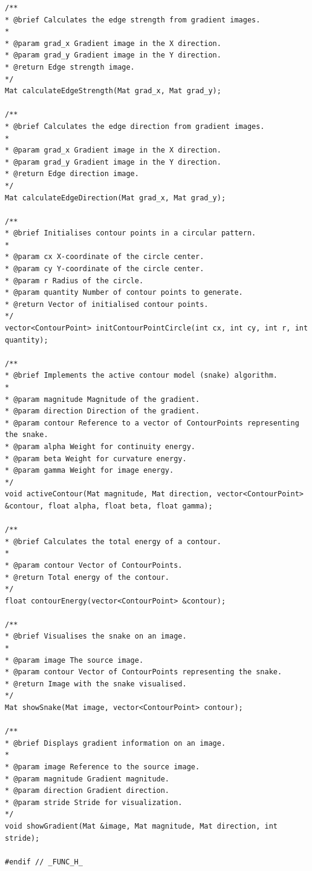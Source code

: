 \documentclass[12pt,a4paper]{report}
\begin{document}
\begin{lstlisting}
/**
* @brief Calculates the edge strength from gradient images.
*
* @param grad_x Gradient image in the X direction.
* @param grad_y Gradient image in the Y direction.
* @return Edge strength image.
*/
Mat calculateEdgeStrength(Mat grad_x, Mat grad_y);

/**
* @brief Calculates the edge direction from gradient images.
*
* @param grad_x Gradient image in the X direction.
* @param grad_y Gradient image in the Y direction.
* @return Edge direction image.
*/
Mat calculateEdgeDirection(Mat grad_x, Mat grad_y);

/**
* @brief Initialises contour points in a circular pattern.
*
* @param cx X-coordinate of the circle center.
* @param cy Y-coordinate of the circle center.
* @param r Radius of the circle.
* @param quantity Number of contour points to generate.
* @return Vector of initialised contour points.
*/
vector<ContourPoint> initContourPointCircle(int cx, int cy, int r, int quantity);

/**
* @brief Implements the active contour model (snake) algorithm.
*
* @param magnitude Magnitude of the gradient.
* @param direction Direction of the gradient.
* @param contour Reference to a vector of ContourPoints representing the snake.
* @param alpha Weight for continuity energy.
* @param beta Weight for curvature energy.
* @param gamma Weight for image energy.
*/
void activeContour(Mat magnitude, Mat direction, vector<ContourPoint> &contour, float alpha, float beta, float gamma);

/**
* @brief Calculates the total energy of a contour.
*
* @param contour Vector of ContourPoints.
* @return Total energy of the contour.
*/
float contourEnergy(vector<ContourPoint> &contour);

/**
* @brief Visualises the snake on an image.
*
* @param image The source image.
* @param contour Vector of ContourPoints representing the snake.
* @return Image with the snake visualised.
*/
Mat showSnake(Mat image, vector<ContourPoint> contour);

/**
* @brief Displays gradient information on an image.
*
* @param image Reference to the source image.
* @param magnitude Gradient magnitude.
* @param direction Gradient direction.
* @param stride Stride for visualization.
*/
void showGradient(Mat &image, Mat magnitude, Mat direction, int stride);

#endif // _FUNC_H_

\end{lstlisting}
\end{document}
